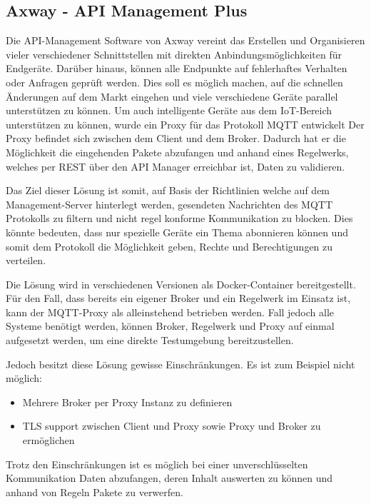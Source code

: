    \subsection{Axway - API Management Plus}
    Die API-Management Software von Axway vereint das Erstellen und Organisieren vieler verschiedener Schnittstellen mit direkten Anbindungsmöglichkeiten für Endgeräte. Darüber hinaus, können alle Endpunkte auf fehlerhaftes Verhalten oder Anfragen geprüft werden. Dies soll es möglich machen, auf die schnellen Änderungen auf dem Markt eingehen und viele verschiedene Geräte parallel unterstützen zu können.
    Um auch intelligente Geräte aus dem \ac{IoT}-Bereich unterstützen zu können, wurde ein Proxy für das Protokoll \ac{MQTT} entwickelt \cite{axway_2018} Der Proxy befindet sich zwischen dem Client und dem Broker. Dadurch hat er die Möglichkeit die eingehenden Pakete abzufangen und anhand eines Regelwerks, welches per REST über den API Manager erreichbar ist, Daten zu validieren.
    
    Das Ziel dieser Lösung ist somit, auf Basis der Richtlinien welche auf dem Management-Server hinterlegt werden, gesendeten Nachrichten des \ac{MQTT} Protokolls zu filtern und nicht regel konforme Kommunikation zu blocken. Dies könnte bedeuten, dass nur spezielle Geräte ein Thema abonnieren können und somit dem Protokoll die Möglichkeit geben, Rechte und Berechtigungen zu verteilen.
    
    Die Lösung wird in verschiedenen Versionen als Docker-Container bereitgestellt. Für den Fall, dass bereits ein eigener Broker und ein Regelwerk im Einsatz ist, kann der \ac{MQTT}-Proxy als alleinstehend betrieben werden. Fall jedoch alle Systeme benötigt werden, können Broker, Regelwerk und Proxy auf einmal aufgesetzt werden, um eine direkte Testumgebung bereitzustellen.
    
    Jedoch besitzt diese Lösung gewisse Einschränkungen.
    Es ist zum Beispiel nicht möglich:
    \begin{itemize}
        \item Mehrere Broker per Proxy Instanz zu definieren
        \item TLS support zwischen Client und Proxy sowie Proxy und Broker zu ermöglichen
    \end{itemize}
    
    Trotz den Einschränkungen ist es möglich bei einer unverschlüsselten Kommunikation Daten abzufangen, deren Inhalt auswerten zu können und anhand von Regeln Pakete zu verwerfen.
    
